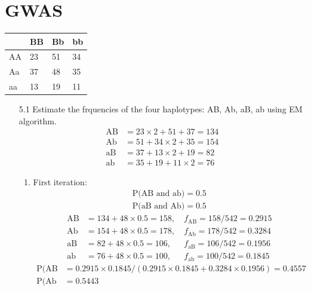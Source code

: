 \documentclass{article}
\begin{document}
\section{GWAS}
\begin{table}[h]
    \centering
    \begin{tabular}{|l|l|l|l|}
        \hline
       & BB & Bb & bb \\ \hline
    AA & 23 & 51 & 34 \\ \hline
    Aa & 37 & 48 & 35 \\ \hline
    aa & 13 & 19 & 11 \\ \hline
    \end{tabular}
    \end{table}
\begin{itemize}
\item[5.1] Estimate the frquencies of the four haplotypes: AB, Ab, aB, ab using EM algorithm.
\begin{align*}
    \text{AB} &= 23 \times 2 + 51 + 37 = 134\\
    \text{Ab} &= 51 + 34 \times 2 + 35 = 154\\
    \text{aB} &= 37 + 13 \times 2 + 19 = 82\\
    \text{ab} &= 35 + 19 + 11 \times 2 = 76
\end{align*}

\begin{enumerate}
\item First iteration: 
    \begin{equation*}
    \begin{split}
        \text{P(AB and ab)} = 0.5\\
        \text{P(aB and Ab)} = 0.5
    \end{split}    
    \end{equation*}
    \begin{align*}
        \text{AB} &= 134 + 48\times 0.5 = 158, &~  f_{\text{AB}} = 158/542 = 0.2915\\
        \text{Ab} &= 154 + 48\times 0.5 = 178, &~  f_{\text{Ab}} = 178/542 = 0.3284\\
        \text{aB} &=  82 + 48\times 0.5 = 106, &~ f_{\text{aB}} = 106/542 = 0.1956\\
        \text{ab} &=  76 + 48\times 0.5 = 100, &~ f_{\text{ab}} = 100/542 = 0.1845
    \end{align*}
    \begin{align*}
       \text{P(AB and ab)} &= 0.2915 \times 0.1845 / (0.2915 \times 0.1845 + 0.3284 \times 0.1956) = 0.4557\\
       \text{P(Ab and aB)} &= 0.5443
    \end{align*}


\end{enumerate}
\end{itemize}
\end{document}
